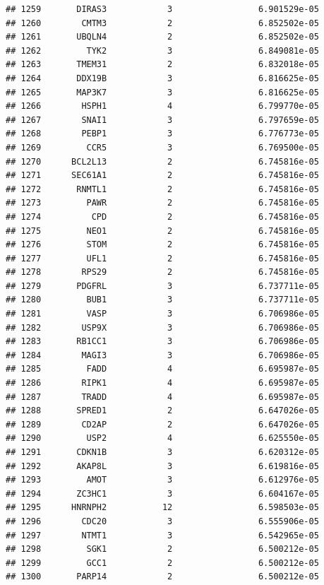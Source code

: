 \documentclass[
]{article}
\begin{document}
\begin{verbatim}
## 1259       DIRAS3            3                 6.901529e-05
## 1260        CMTM3            2                 6.852502e-05
## 1261       UBQLN4            2                 6.852502e-05
## 1262         TYK2            3                 6.849081e-05
## 1263       TMEM31            2                 6.832018e-05
## 1264       DDX19B            3                 6.816625e-05
## 1265       MAP3K7            3                 6.816625e-05
## 1266        HSPH1            4                 6.799770e-05
## 1267        SNAI1            3                 6.797659e-05
## 1268        PEBP1            3                 6.776773e-05
## 1269         CCR5            3                 6.769500e-05
## 1270      BCL2L13            2                 6.745816e-05
## 1271      SEC61A1            2                 6.745816e-05
## 1272       RNMTL1            2                 6.745816e-05
## 1273         PAWR            2                 6.745816e-05
## 1274          CPD            2                 6.745816e-05
## 1275         NEO1            2                 6.745816e-05
## 1276         STOM            2                 6.745816e-05
## 1277         UFL1            2                 6.745816e-05
## 1278        RPS29            2                 6.745816e-05
## 1279       PDGFRL            3                 6.737711e-05
## 1280         BUB1            3                 6.737711e-05
## 1281         VASP            3                 6.706986e-05
## 1282        USP9X            3                 6.706986e-05
## 1283       RB1CC1            3                 6.706986e-05
## 1284        MAGI3            3                 6.706986e-05
## 1285         FADD            4                 6.695987e-05
## 1286        RIPK1            4                 6.695987e-05
## 1287        TRADD            4                 6.695987e-05
## 1288       SPRED1            2                 6.647026e-05
## 1289        CD2AP            2                 6.647026e-05
## 1290         USP2            4                 6.625550e-05
## 1291       CDKN1B            3                 6.620312e-05
## 1292       AKAP8L            3                 6.619816e-05
## 1293         AMOT            3                 6.612976e-05
## 1294       ZC3HC1            3                 6.604167e-05
## 1295      HNRNPH2           12                 6.598503e-05
## 1296        CDC20            3                 6.555906e-05
## 1297        NTMT1            3                 6.542965e-05
## 1298         SGK1            2                 6.500212e-05
## 1299         GCC1            2                 6.500212e-05
## 1300       PARP14            2                 6.500212e-05

\end{verbatim}
\end{document}
